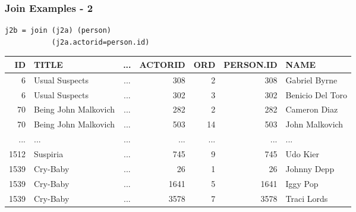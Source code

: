 \documentclass[dvipsnames]{beamer}
\theoremstyle{plain}
\begin{document}
\begin{frame}[fragile]
  \frametitle{Join Examples - 2}

  \begin{example}
    \begin{lstlisting}
j2b = join (j2a) (person)
           (j2a.actorid=person.id)
    \end{lstlisting}

    \pause
    \begin{tiny}
    \begin{table}
      \begin{tabular}{|r|l|c|r|r|r|l|}\hline
  ID & TITLE                & ... & ACTORID & ORD & PERSON.ID & NAME            \\\hline\hline
   6 & Usual Suspects       & ... &     308 &   2 &       308 & Gabriel Byrne   \\\hline
   6 & Usual Suspects       & ... &     302 &   3 &       302 & Benicio Del Toro\\\hline
  70 & Being John Malkovich & ... &     282 &   2 &       282 & Cameron Diaz    \\\hline
  70 & Being John Malkovich & ... &     503 &  14 &       503 & John Malkovich  \\\hline
 ... & ...                  & ... &     ... & ... &       ... & ...             \\\hline
1512 & Suspiria             & ... &     745 &   9 &       745 & Udo Kier        \\\hline
1539 & Cry-Baby             & ... &      26 &   1 &        26 & Johnny Depp     \\\hline
1539 & Cry-Baby             & ... &    1641 &   5 &      1641 & Iggy Pop        \\\hline
1539 & Cry-Baby             & ... &    3578 &   7 &      3578 & Traci Lords     \\\hline
      \end{tabular}
    \end{table}
    \end{tiny}
  \end{example}
\end{frame}
\end{document}
